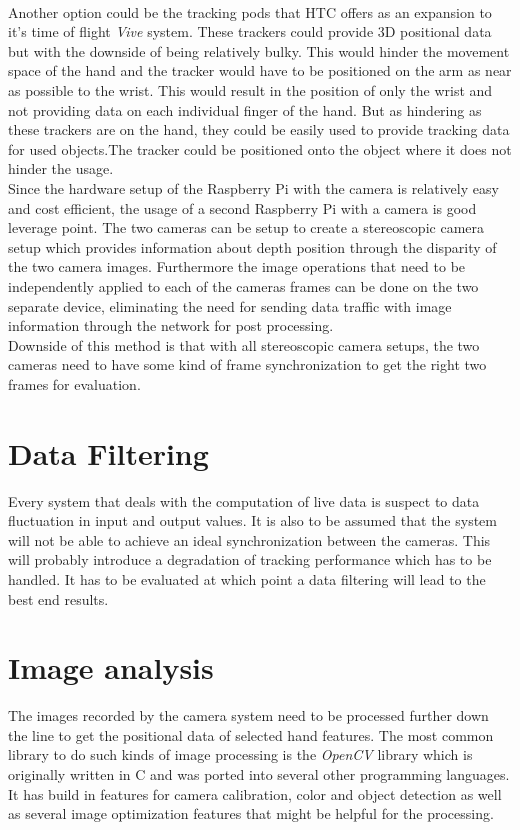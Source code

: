 \\Another option could be the tracking  pods that HTC offers as an expansion to it's time of flight \textit{Vive} system. These trackers could provide 3D positional data but with the downside of being relatively bulky. This would hinder the movement space of the hand and the tracker would have to be positioned on the arm as near as possible to the wrist. This would result in the position of only the wrist and not providing data on each individual finger of the hand. But as hindering as these trackers are on the hand, they could be easily used to provide tracking data for used objects.The tracker could be positioned onto the object where it does not hinder the usage. \\
Since the hardware setup of the Raspberry Pi with the camera is relatively easy and cost efficient, the usage of a second Raspberry Pi with a camera is good leverage point. The two cameras can be setup to create a stereoscopic camera setup which provides information about depth position through the disparity of the two camera images. 
Furthermore the image operations that need to be independently applied to each of the cameras frames can be done on the two separate device, eliminating the need for sending data traffic with image information through the network for post processing.
\\Downside of this method is that with all stereoscopic camera setups, the two cameras need to have some kind of frame synchronization to get the right two frames for evaluation.
\section{Data Filtering}
Every system that deals with the computation of live data is suspect to data fluctuation in input and output values. It is also to be assumed that the system will not be able to achieve an ideal synchronization between the cameras. This will probably introduce a degradation of tracking performance which has to be handled. It has to be evaluated at which point a data filtering will lead to the best end results.
\section{Image analysis}
The images recorded by the camera system need to be processed further down the line to get the positional data of selected hand features. The most common library to do such kinds of image processing is the \textit{OpenCV} \cite{OpenCV.2018} library which is originally written in C and was ported into several other programming languages. It has build in features for camera calibration, color and object detection as well as several image optimization features that might be helpful for the processing.
